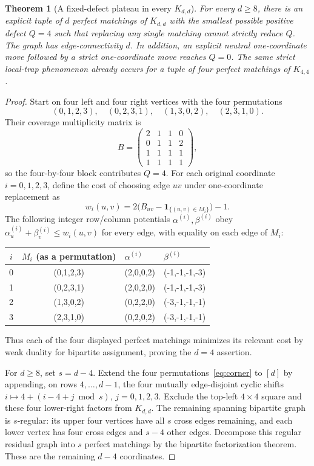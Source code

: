 \documentclass[10pt]{article}
\newtheorem{theorem}{Theorem}[section]
\begin{document}
\begin{theorem}[A fixed-defect plateau in every $K_{d,d}$]\label{thm:kdd}
For every $d\ge8$, there is an explicit tuple of $d$ perfect matchings of $K_{d,d}$ with the smallest possible positive defect $Q=4$ such that replacing any single matching cannot strictly reduce $Q$. The graph has edge-connectivity $d$. In addition, an explicit neutral one-coordinate move followed by a strict one-coordinate move reaches $Q=0$. The same strict local-trap phenomenon already occurs for a tuple of four perfect matchings of $K_{4,4}$.
\end{theorem}
\begin{proof}
Start on four left and four right vertices with the four permutations
\begin{equation}\label{eq:corner}
 (0,1,2,3),\quad (0,2,3,1),\quad (1,3,0,2),\quad (2,3,1,0).
\end{equation}
Their coverage multiplicity matrix is
\[B=\begin{pmatrix}2&1&1&0\\0&1&1&2\\1&1&1&1\\1&1&1&1\end{pmatrix},\]
so the four-by-four block contributes $Q=4$. For each original coordinate $i=0,1,2,3$, define the cost of choosing edge $uv$ under one-coordinate replacement as
\[w_i(u,v)=2\bigl(B_{uv}-\mathbf 1_{\{(u,v)\in M_i\}}\bigr)-1.\]
The following integer row/column potentials $\alpha^{(i)},\beta^{(i)}$ obey $\alpha^{(i)}_u+\beta^{(i)}_v\le w_i(u,v)$ for every edge, with equality on each edge of $M_i$:
\begin{center}\small
\begin{tabular}{ccll}\toprule
$i$ & $M_i$ (as a permutation) & $\alpha^{(i)}$ & $\beta^{(i)}$\\\midrule
0&(0,1,2,3)&(2,0,0,2)&(-1,-1,-1,-3)\\
1&(0,2,3,1)&(2,0,2,0)&(-1,-1,-1,-3)\\
2&(1,3,0,2)&(0,2,2,0)&(-3,-1,-1,-1)\\
3&(2,3,1,0)&(0,2,0,2)&(-3,-1,-1,-1)\\\bottomrule
\end{tabular}
\end{center}
Thus each of the four displayed perfect matchings minimizes its relevant cost by weak duality for bipartite assignment, proving the $d=4$ assertion.

For $d\ge8$, set $s=d-4$. Extend the four permutations~\eqref{eq:corner} to $[d]$ by appending, on rows $4,\ldots,d-1$, the four mutually edge-disjoint cyclic shifts $i\mapsto4+(i-4+j\bmod s)$, $j=0,1,2,3$. Exclude the top-left $4\times4$ square and these four lower-right factors from $K_{d,d}$. The remaining spanning bipartite graph is $s$-regular: its upper four vertices have all $s$ cross edges remaining, and each lower vertex has four cross edges and $s-4$ other edges. Decompose this regular residual graph into $s$ perfect matchings by the bipartite factorization theorem. These are the remaining $d-4$ coordinates.


\end{proof}
\end{document}
